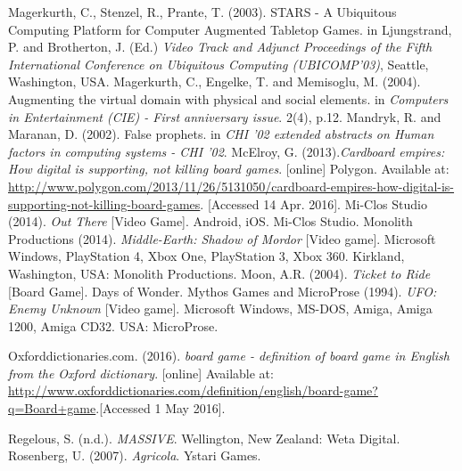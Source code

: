 \documentclass[a4paper,11pt]{report}
\begin{document}
\begin{thebibliography}{1}
Magerkurth, C., Stenzel, R., Prante, T. (2003). STARS - A Ubiquitous Computing Platform for Computer Augmented Tabletop Games. in Ljungstrand, P. and Brotherton, J. (Ed.) \textit{Video Track and Adjunct Proceedings of the Fifth
International Conference on Ubiquitous Computing (UBICOMP’03)}, Seattle, Washington, USA.
Magerkurth, C., Engelke, T. and Memisoglu, M. (2004). Augmenting the virtual domain with physical and social elements. in \textit{Computers in Entertainment (CIE) - First anniversary issue}. 2(4), p.12. 
Mandryk, R. and Maranan, D. (2002). False prophets. in \textit{CHI '02 extended abstracts on Human factors in computing systems - CHI '02}.
McElroy, G. (2013).\textit{Cardboard empires: How digital is supporting, not killing board games}. [online] Polygon. Available at: \url{http://www.polygon.com/2013/11/26/5131050/cardboard-empires-how-digital-is-supporting-not-killing-board-games}. [Accessed 14 Apr. 2016].
Mi-Clos Studio (2014). \textit{Out There} [Video Game]. Android, iOS. Mi-Clos Studio.
Monolith Productions (2014). \textit{Middle-Earth: Shadow of Mordor} [Video game]. Microsoft Windows, PlayStation 4, Xbox One, PlayStation 3, Xbox 360. Kirkland, Washington, USA: Monolith Productions.
Moon, A.R. (2004). \textit{Ticket to Ride} [Board Game]. Days of Wonder.
Mythos Games and MicroProse (1994). \textit{UFO: Enemy Unknown} [Video game]. Microsoft Windows, MS-DOS, Amiga, Amiga 1200, Amiga CD32. USA: MicroProse.

Oxforddictionaries.com. (2016). \textit{board game - definition of board game in English from the Oxford dictionary}. [online] Available at:  \url{http://www.oxforddictionaries.com/definition/english/board-game?q=Board+game}.[Accessed 1 May 2016].

Regelous, S. (n.d.). \textit{MASSIVE}. Wellington, New Zealand: Weta Digital.
Rosenberg, U. (2007). \textit{Agricola}. Ystari Games.


\end{thebibliography}
\end{document}
